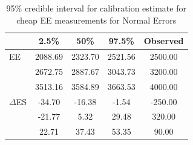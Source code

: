 \documentclass[11pt]{article}\usepackage[]{graphicx}\usepackage[]{color}
\begin{document}
\begin{table}[ht]
\centering
\begin{tabular}{l|ccc|c}
  \hline
 & 2.5\% & 50\% & 97.5\% & Observed \\ 
  \hline
EE & 2088.69 & 2323.70 & 2521.56 & 2500.00 \\ 
  & 2672.75 & 2887.67 & 3043.73 & 3200.00 \\ 
  & 3513.16 & 3584.89 & 3663.53 & 4000.00 \\ 
  $\Delta$ES & -34.70 & -16.38 & -1.54 & -250.00 \\ 
  & -21.77 & 5.32 & 29.48 & 320.00 \\ 
  & 22.71 & 37.43 & 53.35 & 90.00 \\ 
   \hline
\end{tabular}
\caption{95\% credible interval for calibration estimate for cheap EE measurements for Normal Errors} 
\label{calibratedee}
\end{table}
\end{document}
